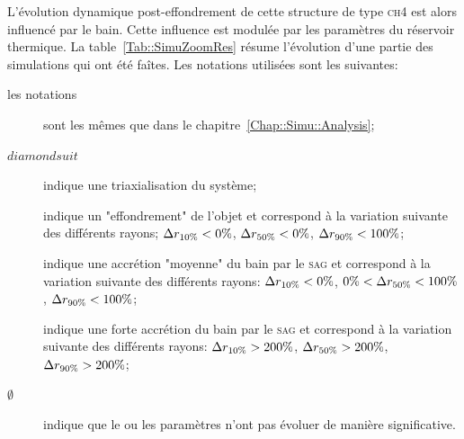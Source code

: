 	L'évolution dynamique post-effondrement de cette structure de type \textsc{ch4} est alors influencé par le bain. Cette influence est modulée
	par les paramètres du réservoir thermique. La table~\ref{Tab::SimuZoomRes} résume l'évolution d'une partie des simulations qui ont été faîtes.
	Les notations utilisées sont les suivantes:
	\begin{description}
		\item[les notations] sont les mêmes que dans le chapitre~\ref{Chap::Simu::Analysis};
		\item[$diamondsuit$] indique une triaxialisation du système;
		\item[\accretionpeu{}] indique un "effondrement" de l'objet et correspond à la variation suivante des différents rayons;
			$\Delta r_{10\%}<0\%$, $\Delta r_{50\%}<0\%$, $\Delta r_{90\%}<100\%$;
		\item[\accretionmoyen{}]  indique une accrétion "moyenne" du bain par le \textsc{sag} et correspond à la variation suivante des
			différents rayons: $\Delta r_{10\%}<0\%$, $0\%<\Delta r_{50\%}<100\%$, $\Delta r_{90\%}<100\%$;
		\item[\accretionlot{}] indique une forte accrétion du bain par le \textsc{sag} et correspond à la variation suivante des différents
			rayons: $\Delta r_{10\%}>200\%$, $\Delta r_{50\%}>200\%$, $\Delta r_{90\%}>200\%$;
		\item[$\emptyset$] indique que le ou les paramètres n'ont pas évoluer de manière significative.
	\end{description}


